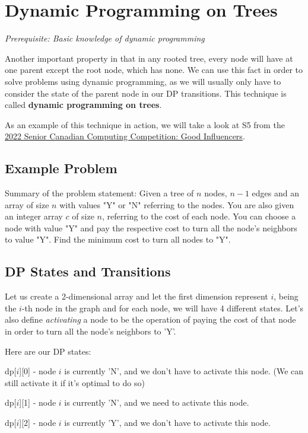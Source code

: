 \documentclass{article}
\begin{document}
\section{Dynamic Programming on Trees}
\textit{Prerequisite: Basic knowledge of dynamic programming}

Another important property in that in any rooted tree, every node will have at one parent except the root node, which has none. We can use this fact in order to solve problems using dynamic programming, as we will usually only have to consider the state of the parent node in our DP transitions. This technique is called \textbf{dynamic programming on trees}.

As an example of this technique in action, we will take a look at S5 from the \href{https://dmoj.ca/problem/ccc22s5}{2022 Senior Canadian Computing Competition: Good Influencers}.

\subsection{Example Problem}

Summary of the problem statement:
Given a tree of $n$ nodes, $n - 1$ edges and an array of size $n$ with values "Y" or "N" referring to the nodes. You are also given an integer array $c$ of size $n$, referring to the cost of each node. You can choose a node with value "Y" and pay the respective cost to turn all the node's neighbors to value "Y". Find the minimum cost to turn all nodes to "Y".

\subsection{DP States and Transitions}
Let us create a 2-dimensional array and let the first dimension represent $i$, being the $i$-th node in the graph and for each node, we will have 4 different states. Let's also define \textit{activating} a node to be the operation of paying the cost of that node in order to turn all the node's neighbors to 'Y'.

 Here are our DP states:

dp[$i$][0] - node $i$ is currently 'N', and we don't have to activate this node. (We can still activate it if it's optimal to do so)

dp[$i$][1] - node $i$ is currently 'N', and we need to activate this node.

dp[$i$][2] - node $i$ is currently 'Y', and we don't have to activate this node.
\end{document}
